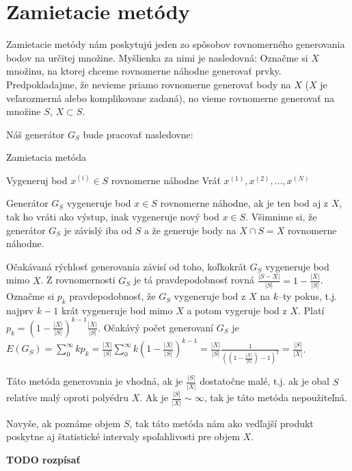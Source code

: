 \section{Zamietacie metódy}

Zamietacie metódy nám poskytujú jeden zo spôsobov rovnomerného generovania bodov na určitej množine.
Myšlienka za nimi je nasledovná: Označme si $X$ množinu, na ktorej chceme rovnomerne náhodne generovať prvky. Predpokladajme, že nevieme priamo rovnomerne generovať body na $X$ ($X$ je veľarozmerná alebo komplikovane zadaná), no vieme rovnomerne generovať na množine $S$, $X \subset S$.

Náš generátor $G_S$ bude pracovať nasledovne:

\begin{algorithm}[H]
	\caption{Zamietacia metóda}
	\label{zamietanie:basic}
	\begin{algorithmic}[1]
			\Repeat Vygeneruj bod $x^{(i)} \in S$ rovnomerne náhodne
		\EndFor
		\State Vráť ${x^{(1)},x^{(2)},\dots,x^{(N)}}$
	\end{algorithmic}
\end{algorithm}
Generátor $G_S$ vygeneruje bod $x \in S$ rovnomerne náhodne, ak je ten bod aj z $X$, tak ho vráti ako výstup, inak vygeneruje nový bod $x \in S$. Všimnime si, že generátor $G_S$ je závislý iba od $S$ a že generuje body na $X \cap S=X$ rovnomerne náhodne.

Očakávaná rýchlosť generovania závisí od toho, koľkokrát $G_S$ vygeneruje bod mimo $X$. Z rovnomernosti $G_S$ je tá pravdepodobnosť rovná $\frac{|S-X|}{|S|} = 1-\frac{|X|}{|S|}$. Označme si $p_k$ pravdepodobnosť, že $G_S$ vygeneruje bod z $X$ na $k$--ty pokus, t.j. najprv $k-1$ krát vygeneruje bod mimo $X$ a potom vygeruje bod z $X$. Platí $p_k= (1-\frac{|X|}{|S|})^{k-1}\frac{|X|}{|S|}$. Očakávý počet generovaní $G_S$ je $E(G_S)=\sum^{\infty}_{0}kp_k=\frac{|X|}{|S|} \sum^{\infty}_{0}k(1-\frac{|X|}{|S|})^{k-1}=\frac{|X|}{|S|} \frac{1}{((1-\frac{|X|}{|S|})-1)^2} = \frac{|S|}{|X|}$.

Táto metóda generovania je vhodná, ak je $\frac{|S|}{|X|}$ dostatočne malé, t.j. ak je obal $S$ relatíve malý oproti polyédru $X$. Ak je $\frac{|S|}{|X|} \sim \infty$, tak je táto metóda nepoužiteľná.

Navyše, ak poznáme objem $S$, tak táto metóda nám ako vedľajší produkt poskytne aj štatistické intervaly spoľahlivosti pre objem $X$.

\textbf{TODO rozpísať}

